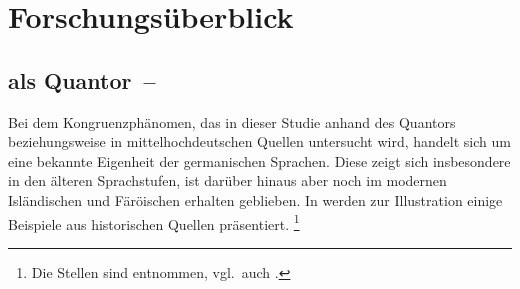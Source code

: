 \chapter{Forschungsüberblick}
\label{ch:forschungsueberblick}

\section%
	{ als Quantor~-- }
\label{sec:ovwbeidequant}

Bei dem Kongruenzphänomen, das in dieser Studie anhand des Quantors
  beziehungsweise
  in mittelhochdeutschen
Quellen untersucht wird, handelt sich um eine bekannte Eigenheit der
germanischen Sprachen. Diese zeigt sich insbesondere in den
älteren Sprachstufen, ist darüber hinaus aber noch im modernen
Isländischen \autocites[283]{corbett1991}[569]{wechsler2009} und
Färöischen \autocite[225--226]{thrainsson2004} erhalten geblieben.
In  werden zur Illustration einige Beispiele aus
historischen Quellen präsentiert.%
%
	\footnote{Die Stellen sind \citet[12]{askedal1973} entnommen, vgl.~auch
		\citet{hock2008,hock2009}.}

